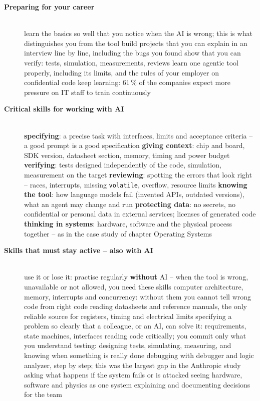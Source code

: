 \begin{description}
\item[{\rot\bf Preparing for your career}]~\\[-\lblskip]
\bi
	\ite learn the basics so well that you notice when the AI is wrong; this is what distinguishes you from the tool
	\ite build projects that you can explain in an interview line by line, including the bugs you found
	\ite show that you can verify: tests, simulation, measurements, reviews
	\ite learn one agentic tool properly, including its limits, and the rules of your employer on confidential code
	\ite keep learning: 61\,\% of the companies expect more pressure on IT staff to train continuously \cite{bitkom2026}
\ei
\os{\newpage}

\item[{\rot\bf Critical skills for working with AI}]~\\[-\lblskip]
\bi
	\ite \textbf{specifying}: a precise task with interfaces, limits and acceptance criteria -- a good prompt is a good specification
	\ite \textbf{giving context}: chip and board, SDK version, datasheet section, memory, timing and power budget
	\ite \textbf{verifying}: tests designed independently of the code, simulation, measurement on the target
	\ite \textbf{reviewing}: spotting the errors that look right -- races, interrupts, missing \texttt{volatile}, overflow, resource limits
	\ite \textbf{knowing the tool}: how language models fail (invented APIs, outdated versions), what an agent may change and run
	\ite \textbf{protecting data}: no secrets, no confidential or personal data in external services; licenses of generated code
	\ite \textbf{thinking in systems}: hardware, software and the physical process together -- as in the case study of chapter Operating Systems
\ei
\os{\newpage}

\item[{\rot\bf Skills that must stay active -- also with AI}]~\\[-\lblskip]
\bi
	\ite use it or lose it: practise regularly \textbf{without} AI -- when the tool is wrong, unavailable or not allowed, you need these skills
	\ite computer architecture, memory, interrupts and concurrency: without them you cannot tell wrong code from right code
	\ite reading datasheets and reference manuals, the only reliable source for registers, timing and electrical limits
	\ite specifying a problem so clearly that a colleague, or an AI, can solve it: requirements, state machines, interfaces
	\ite reading code critically; you commit only what you understand
	\ite testing: designing tests, simulating, measuring, and knowing when something is really done
	\ite debugging with debugger and logic analyzer, step by step; this was the largest gap in the Anthropic study
	\ite asking what happens if the system fails or is attacked
	\ite seeing hardware, software and physics as one system
	\ite explaining and documenting decisions for the team
\ei
\os{\newpage}


\end{description}
